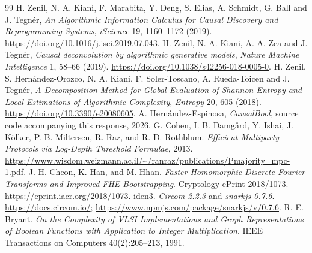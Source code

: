 \documentclass[11pt,a4paper]{article}
\begin{document}
\begin{thebibliography}{99}
 H. Zenil, N. A. Kiani, F. Marabita, Y. Deng,
S. Elias, A. Schmidt, G. Ball and J. Tegnér, \emph{An Algorithmic Information
Calculus for Causal Discovery and Reprogramming Systems}, \emph{iScience}
19, 1160--1172 (2019).\\ \url{https://doi.org/10.1016/j.isci.2019.07.043}.
 H. Zenil, N. A. Kiani, A. A. Zea and
J. Tegnér, \emph{Causal deconvolution by algorithmic generative models},
\emph{Nature Machine Intelligence} 1, 58--66 (2019).
\url{https://doi.org/10.1038/s42256-018-0005-0}.
 H. Zenil, S. Hernández-Orozco, N. A. Kiani,
F. Soler-Toscano, A. Rueda-Toicen and J. Tegnér, \emph{A Decomposition Method
for Global Evaluation of Shannon Entropy and Local Estimations of Algorithmic
Complexity}, \emph{Entropy} 20, 605 (2018).
\url{https://doi.org/10.3390/e20080605}.
 A. Hernández-Espinosa, \emph{CausalBool}, source code
accompanying this response, 2026.
 G. Cohen, I. B. Damg\aa rd, Y. Ishai, J. K\"olker,
P. B. Miltersen, R. Raz, and R. D. Rothblum.
\emph{Efficient Multiparty Protocols via Log-Depth Threshold Formulae}, 2013.
\url{https://www.wisdom.weizmann.ac.il/~/ranraz/publications/Pmajority_mpc-1.pdf}.
 J. H. Cheon, K. Han, and M. Hhan.
\emph{Faster Homomorphic Discrete Fourier Transforms and Improved FHE
Bootstrapping}. Cryptology ePrint 2018/1073.
\url{https://eprint.iacr.org/2018/1073}.
 iden3. \emph{Circom 2.2.3} and \emph{snarkjs 0.7.6}.
\url{https://docs.circom.io/};
\url{https://www.npmjs.com/package/snarkjs/v/0.7.6}.
 R. E. Bryant. \emph{On the Complexity of VLSI Implementations
and Graph Representations of Boolean Functions with Application to Integer
Multiplication}. IEEE Transactions on Computers 40(2):205--213, 1991.
\end{thebibliography}
\end{document}
